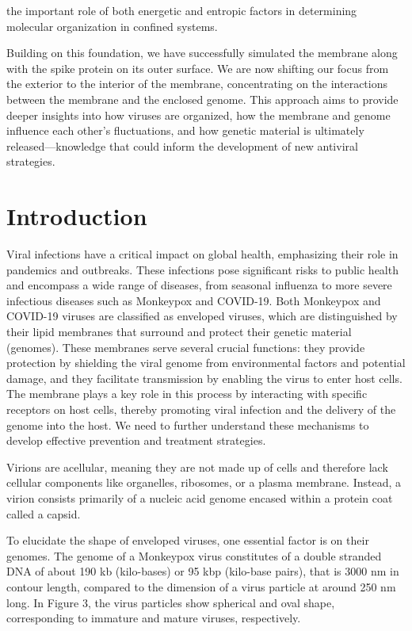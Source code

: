 \documentclass[12pt]{article}
\begin{document}
\begin{flushleft}
 \noindent  the important role of both energetic and entropic factors in determining molecular organization in confined systems.


Building on this foundation, we have successfully simulated the membrane along with the spike protein on its outer surface. We are now shifting our focus from the exterior to the interior of the membrane, concentrating on the interactions between the membrane and the enclosed genome. This approach aims to provide deeper insights into how viruses are organized, how the membrane and genome influence each other’s fluctuations, and how genetic material is ultimately released—knowledge that could inform the development of new antiviral strategies.



\vspace{-1em} 

\section*{Introduction}




Viral infections have a critical impact on global health, emphasizing their role in pandemics and outbreaks. These infections pose significant risks to public health and encompass a wide range of diseases, from seasonal influenza to more severe infectious diseases such as Monkeypox and COVID-19. Both Monkeypox and COVID-19 viruses are classified as enveloped viruses, which are distinguished by their lipid membranes that surround and protect their genetic material (genomes). These membranes serve several crucial functions: they provide protection by shielding the viral genome from environmental factors and potential damage, and they facilitate transmission by enabling the virus to enter host cells. The membrane plays a key role in this process by interacting with specific receptors on host cells, thereby promoting viral infection and the delivery of the genome into the host. We need to further understand these mechanisms to develop effective prevention and treatment strategies.




Virions are acellular, meaning they are not made up of cells and therefore lack cellular components like organelles, ribosomes, or a plasma membrane. Instead, a virion consists primarily of a nucleic acid genome encased within a protein coat called a capsid. 

To elucidate the shape of enveloped viruses, one essential factor is on their genomes. The genome of a Monkeypox virus constitutes of a double stranded DNA of about 190 kb (kilo-bases) or 95 kbp (kilo-base pairs), that is 3000 nm in contour length, compared to the dimension of a virus particle at around 250 nm long\cite{erez2019diagnosis}\cite{parker2007human}. In Figure 3, the virus particles show spherical and oval shape, corresponding to immature and mature viruses, respectively.


\end{flushleft}
\end{document}
